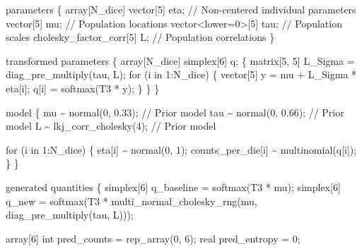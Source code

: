 \documentclass[
  letterpaper,
  DIV=11,
  numbers=noendperiod]{scrartcl}
\newenvironment{Shaded}{\begin{snugshade}}{\end{snugshade}}
\newcommand{\CommentTok}[1]{\textcolor[rgb]{0.37,0.37,0.37}{#1}}
\newcommand{\ControlFlowTok}[1]{\textcolor[rgb]{0.00,0.23,0.31}{#1}}
\newcommand{\DataTypeTok}[1]{\textcolor[rgb]{0.68,0.00,0.00}{#1}}
\newcommand{\DecValTok}[1]{\textcolor[rgb]{0.68,0.00,0.00}{#1}}
\newcommand{\FloatTok}[1]{\textcolor[rgb]{0.68,0.00,0.00}{#1}}
\newcommand{\KeywordTok}[1]{\textcolor[rgb]{0.00,0.23,0.31}{#1}}
\newcommand{\NormalTok}[1]{\textcolor[rgb]{0.00,0.23,0.31}{#1}}
\begin{document}
\begin{codelisting}
\begin{Shaded}
\begin{Highlighting}[]
\KeywordTok{parameters}\NormalTok{ \{}
  \DataTypeTok{array}\NormalTok{[N\_dice] }\DataTypeTok{vector}\NormalTok{[}\DecValTok{5}\NormalTok{] eta; }\CommentTok{// Non{-}centered individual parameters}
  \DataTypeTok{vector}\NormalTok{[}\DecValTok{5}\NormalTok{] mu;                }\CommentTok{// Population locations}
  \DataTypeTok{vector}\NormalTok{\textless{}}\KeywordTok{lower}\NormalTok{=}\DecValTok{0}\NormalTok{\textgreater{}[}\DecValTok{5}\NormalTok{] tau;      }\CommentTok{// Population scales}
  \DataTypeTok{cholesky\_factor\_corr}\NormalTok{[}\DecValTok{5}\NormalTok{] L;   }\CommentTok{// Population correlations}
\NormalTok{\}}

\KeywordTok{transformed parameters}\NormalTok{ \{}
  \DataTypeTok{array}\NormalTok{[N\_dice] }\DataTypeTok{simplex}\NormalTok{[}\DecValTok{6}\NormalTok{] q;}
\NormalTok{  \{}
    \DataTypeTok{matrix}\NormalTok{[}\DecValTok{5}\NormalTok{, }\DecValTok{5}\NormalTok{] L\_Sigma = diag\_pre\_multiply(tau, L);}
    \ControlFlowTok{for}\NormalTok{ (i }\ControlFlowTok{in} \DecValTok{1}\NormalTok{:N\_dice) \{}
      \DataTypeTok{vector}\NormalTok{[}\DecValTok{5}\NormalTok{] y = mu + L\_Sigma * eta[i];}
\NormalTok{      q[i] = softmax(T3 * y);}
\NormalTok{    \}}
\NormalTok{  \}}
\NormalTok{\}}

\KeywordTok{model}\NormalTok{ \{}
\NormalTok{  mu \textasciitilde{} normal(}\DecValTok{0}\NormalTok{, }\FloatTok{0.33}\NormalTok{);     }\CommentTok{// Prior model}
\NormalTok{  tau \textasciitilde{} normal(}\DecValTok{0}\NormalTok{, }\FloatTok{0.66}\NormalTok{);    }\CommentTok{// Prior model}
\NormalTok{  L \textasciitilde{} lkj\_corr\_cholesky(}\DecValTok{4}\NormalTok{); }\CommentTok{// Prior model}

  \ControlFlowTok{for}\NormalTok{ (i }\ControlFlowTok{in} \DecValTok{1}\NormalTok{:N\_dice) \{}
\NormalTok{    eta[i] \textasciitilde{} normal(}\DecValTok{0}\NormalTok{, }\DecValTok{1}\NormalTok{);}
\NormalTok{    counts\_per\_die[i] \textasciitilde{} multinomial(q[i]);}
\NormalTok{  \}}
\NormalTok{\}}

\KeywordTok{generated quantities}\NormalTok{ \{}
  \DataTypeTok{simplex}\NormalTok{[}\DecValTok{6}\NormalTok{] q\_baseline = softmax(T3 * mu);}
  \DataTypeTok{simplex}\NormalTok{[}\DecValTok{6}\NormalTok{] q\_new =}
\NormalTok{    softmax(T3 * multi\_normal\_cholesky\_rng(mu,}
\NormalTok{                                           diag\_pre\_multiply(tau, L)));}

  \DataTypeTok{array}\NormalTok{[}\DecValTok{6}\NormalTok{] }\DataTypeTok{int}\NormalTok{ pred\_counts = rep\_array(}\DecValTok{0}\NormalTok{, }\DecValTok{6}\NormalTok{);}
  \DataTypeTok{real}\NormalTok{ pred\_entropy = }\DecValTok{0}\NormalTok{;}


\end{Highlighting}
\end{Shaded}
\end{codelisting}
\end{document}
